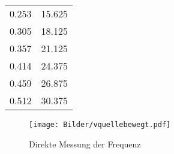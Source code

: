 \begin{table}
\begin{tabular}{cc}
		0.253                                             & 15.625                  \\
		0.305                                             & 18.125                  \\
		0.357                                             & 21.125                  \\
		0.414                                             & 24.375                  \\
		0.459                                             & 26.875                  \\
		0.512                                             & 30.375                  \\
	\end{tabular}
\end{table}
\begin{figure}
	\texttt{[image: Bilder/vquellebewegt.pdf]}
	\caption{Direkte Messung der Frequenz}
	\label{fig:doppler}
\end{figure}
\FloatBarrier
